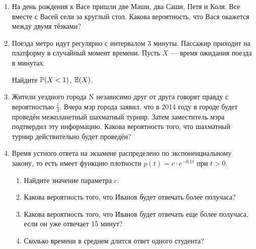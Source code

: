\begin{enumerate}
\item На день рождения к Васе пришли две Маши, два Саши, Петя и Коля. Все вместе с
Васей сели за круглый стол. Какова вероятность, что Вася окажется между двумя тёзками?

\item Поезда метро идут регулярно с интервалом 3 минуты. Пассажир приходит на
платформу в случайный момент времени. Пусть $X$ — время ожидания поезда в минутах.

Найдите $\P(X<1)$, $\E(X)$.


\item Жители уездного города N независимо друг от друга говорят правду с вероятностью
$\frac{1}{3}$. Вчера мэр города заявил, что в 2014 году в городе будет проведён
межпланетный шахматный турнир. Затем заместитель мэра подтвердил эту информацию.
Какова вероятность того, что шахматный турнир действительно будет проведён?

\item Время устного ответа на экзамене распределено по экспоненциальному закону,
то есть имеет функцию плотности $p(t)=c\cdot e^{-0.1t}$ при $t>0$.
\begin{enumerate}
\item Найдите значение параметра $c$.
\item Какова вероятность того, что Иванов будет отвечать более получаса?
\item Какова вероятность того, что Иванов будет отвечать еще более получаса,
если он уже отвечает 15 минут?
\item Сколько времени в среднем длится ответ одного студента?
\end{enumerate}





\end{enumerate}
